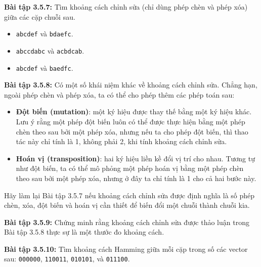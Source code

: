\textbf{Bài tập 3.5.7:} Tìm khoảng cách chỉnh sửa (chỉ dùng phép chèn và phép xóa) giữa các cặp chuỗi sau.
\begin{itemize}
  \item[(a)] \texttt{abcdef} và \texttt{bdaefc}.
  \item[(b)] \texttt{abccdabc} và \texttt{acbdcab}.
  \item[(c)] \texttt{abcdef} và \texttt{baedfc}.
\end{itemize}

\textbf{Bài tập 3.5.8:} Có một số khái niệm khác về khoảng cách chỉnh sửa. Chẳng hạn, ngoài phép chèn và phép xóa, ta có thể cho phép thêm các phép toán sau:
\begin{itemize}
  \item[i.] \textbf{Đột biến (mutation)}: một ký hiệu được thay thế bằng một ký hiệu khác. Lưu ý rằng một phép đột biến luôn có thể được thực hiện bằng một phép chèn theo sau bởi một phép xóa, nhưng nếu ta cho phép đột biến, thì thao tác này chỉ tính là 1, không phải 2, khi tính khoảng cách chỉnh sửa.
  \item[ii.] \textbf{Hoán vị (transposition)}: hai ký hiệu liền kề đổi vị trí cho nhau. Tương tự như đột biến, ta có thể mô phỏng một phép hoán vị bằng một phép chèn theo sau bởi một phép xóa, nhưng ở đây ta chỉ tính là 1 cho cả hai bước này.
\end{itemize}
Hãy làm lại Bài tập 3.5.7 nếu khoảng cách chỉnh sửa được định nghĩa là số phép chèn, xóa, đột biến và hoán vị cần thiết để biến đổi một chuỗi thành chuỗi kia.

\textbf{Bài tập 3.5.9:} Chứng minh rằng khoảng cách chỉnh sửa được thảo luận trong Bài tập 3.5.8 thực sự là một thước đo khoảng cách.

\textbf{Bài tập 3.5.10:} Tìm khoảng cách Hamming giữa mỗi cặp trong số các vector sau: \texttt{000000}, \texttt{110011}, \texttt{010101}, và \texttt{011100}.
